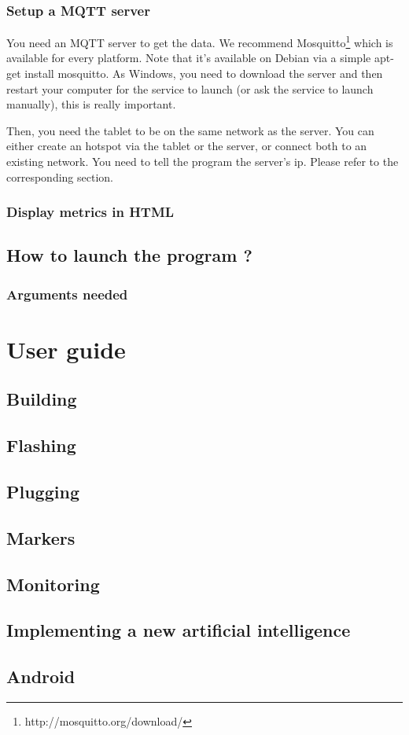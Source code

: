 \documentclass[a4paper,11pt]{report}
\begin{document}
\subsection{Setup a MQTT server}

You need an MQTT server to get the data. We recommend
Mosquitto\footnote{http://mosquitto.org/download/} which is available for every
platform.  Note that it's available on Debian via a simple apt-get install
mosquitto. As Windows, you need to download the server and then restart your
computer for the service to launch (or ask the service to launch manually),
this is really important.

Then, you need the tablet to be on the same network as the server. You can
either create an hotspot via the tablet or the server, or connect both to an
existing network.  You need to tell the program the server's ip. Please refer
to the corresponding section.

\subsection{Display metrics in HTML}

\section{How to launch the program ?}

\subsection{Arguments needed}







\chapter{User guide}

\section{Building}

\section{Flashing}

\section{Plugging}

\section{Markers}

\section{Monitoring}

\section{Implementing a new artificial intelligence}

\section{Android}
\end{document}
